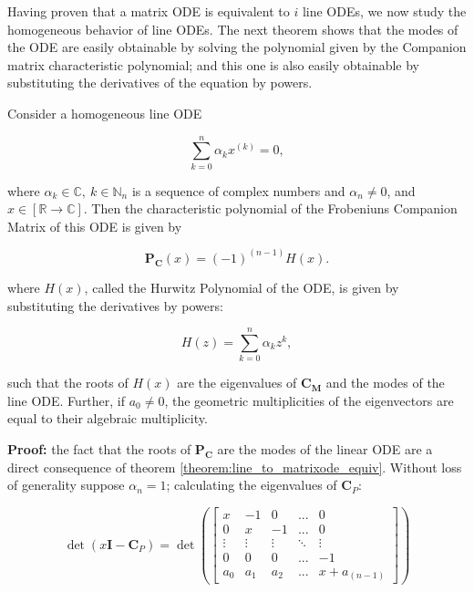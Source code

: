 	Having proven that a matrix ODE is equivalent to $i$ line ODEs, we now study the homogeneous behavior of line ODEs. The next theorem shows that the modes of the ODE are easily obtainable by solving the polynomial given by the Companion matrix characteristic polynomial; and this one is also easily obtainable by substituting the derivatives of the equation by powers.

\begin{theorem} \label{lemma:hurwitz_polynomial} %

	Consider a homogeneous line ODE

\begin{equation} \sum\limits_{k=0}^n \alpha_k x^{\left(k\right)}  = 0, \end{equation}

	\noindent where $\alpha_k\in\mathbb{C},\ k\in\mathbb{N}_n$ is a sequence of complex numbers and $\alpha_n\neq 0$, and $x \in\left[\mathbb{R}\to\mathbb{C}\right]$. Then the characteristic polynomial of the Frobeniuns Companion Matrix of this ODE is given by

\begin{equation} \mathbf{P_C}\left(x\right) = \left(-1\right)^{(n-1)} H(x).\end{equation}

	\noindent where $H(x)$, called the Hurwitz Polynomial of the ODE, is given by substituting the derivatives by powers:

\begin{equation} H(z) = \sum\limits_{k=0}^n \alpha_k z^k, \end{equation}

	\noindent such that the roots of $H(x)$ are the eigenvalues of $\mathbf{C_M}$ and the modes of the line ODE. Further, if $a_0\neq 0$, the geometric multiplicities of the eigenvectors are equal to their algebraic multiplicity.
\end{theorem}
\noindent\textbf{Proof:} the fact that the roots of $\mathbf{P_C}$ are the modes of the linear ODE are a direct consequence of theorem \ref{theorem:line_to_matrixode_equiv}. Without loss of generality suppose $\alpha_n = 1$; calculating the eigenvalues of $\mathbf{C}_P$:

\begin{equation} \det\left(x \mathbf{I} - \mathbf{C}_P\right) = \det\left(\left[\begin{array}{ccccc} x & -1 & 0 & ... & 0 \\[3mm] 0 & x & -1 & ... & 0  \\[3mm] \vdots & \vdots & \vdots & \ddots & \vdots \\[3mm] 0 & 0 & 0 & ... & -1 \\[3mm] a_0 & a_1 & a_2 & ... & x + a_{(n-1)} \end{array}\right]\right) \end{equation}

